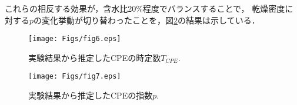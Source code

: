 \documentclass{jsce}
\begin{document}
これらの相反する効果が，含水比20\%程度でバランスすることで，
乾燥密度に対する$p$の変化挙動が切り替わったことを，図\ref{fig:fig7}の結果は示している．
\begin{figure}[h]
	\begin{center}
	\texttt{[image: Figs/fig6.eps]} 
	\end{center}
	\caption{
		実験結果から推定したCPEの時定数$T_{CPE}$.
	} 
	\label{fig:fig6}
\end{figure}
\begin{figure}[h]
	\begin{center}
	\texttt{[image: Figs/fig7.eps]} 
	\end{center}
	\caption{
		実験結果から推定したCPEの指数$p$.
	} 
	\label{fig:fig7}
\end{figure}
\end{document}
